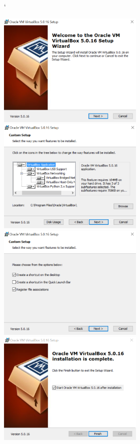 `\documentclass[a4paper,11pt]{report}
\begin{document}
    \includegraphics[width=7cm]{vbox1.PNG}
    \includegraphics[width=7cm]{vbox2.PNG}
    \includegraphics[width=7cm]{vbox3.PNG}
    \includegraphics[width=7cm]{vbox4.PNG} \\
\end{document}
